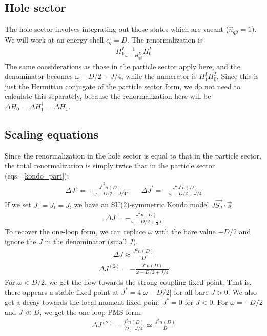 \documentclass{revtex4-2}
\begin{document}
\subsection{Hole sector}
The hole sector involves integrating out those states which are vacant (\(\hat n_{q\beta}=1\)). We will work at an energy  shell \(\epsilon_q = D\). The renormalization is
\begin{align}
	H^I_1 \frac{1}{\omega - H^D_{q\beta}} H^I_0
\end{align}
The same considerations as those in the particle sector apply here, and the denominator becomes \(\omega - D/2 + J/4\), while the numerator is \(H^I_1 H^I_0\). Since this is just the Hermitian conjugate of the particle sector form, we do not need to calculate this separately, because the renormalization here will be \(\Delta H_0 = \Delta H_1^\dagger = \Delta H_1\).

\subsection{Scaling equations}
Since the renormalization in the hole sector is equal to that in the particle sector, the total renormalization is simply twice that in the particle sector (eqs.~\ref{kondo_part}):
\begin{align}
	\Delta J^z = -\frac{{J^t}^2n(D)}{\omega - D/2 + J/4}, && \Delta J^t = -\frac{J^z J^tn(D)}{\omega - D/2 + J/4}
\end{align}
If we set \(J_z = J_t = J\), we have an SU(2)-symmetric Kondo model \(J \vec{S_d}\cdot\vec{s}\).
\begin{align}
	\label{kondosym}
	\Delta J = - \frac{J^2 n(D)}{\omega - D/2 + \frac{1}{4}J}
\end{align}
To recover the one-loop form, we can replace \(\omega\) with the bare value \(-D/2\) and ignore the \(J\) in the denominator (small \(J\)).
\begin{align}
	\Delta J \approx \frac{J^2 n(D)}{D}
\end{align}
\begin{align}
	\Delta J^{(2)} = -\frac{J^2 n(D)}{\omega - D/2 + J/4}
\end{align}
For \(\omega < D/2\), we get the flow towards the strong-coupling fixed point. That is, there appears a stable fixed point at \(J^* = 4|\omega - D/2|\) for all bare \(J > 0\). We also get a decay towards the local moment fixed point \(J^* = 0\) for \(J < 0\). For \(\omega = -D/2\) and \(J \ll D\), we get the one-loop PMS form. 
\begin{align}
	\Delta J^{(2)} = \frac{J^2 n(D)}{D - J/4} \simeq \frac{J^2 n(D)}{D}
\end{align}



\end{document}
